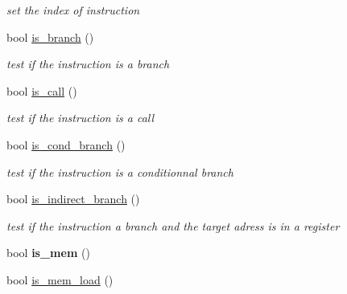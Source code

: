 \begin{DoxyCompactItemize}
\begin{DoxyCompactList}\small\item\em set the index of instruction \end{DoxyCompactList}\item 
\hypertarget{class_instruction_aab8e6a16b8bab5ca90b554086cc3c825}{bool \hyperlink{class_instruction_aab8e6a16b8bab5ca90b554086cc3c825}{is\-\_\-branch} ()}\label{class_instruction_aab8e6a16b8bab5ca90b554086cc3c825}

\begin{DoxyCompactList}\small\item\em test if the instruction is a branch \end{DoxyCompactList}\item 
\hypertarget{class_instruction_ab2a6352a09271a588f6930852a361f67}{bool \hyperlink{class_instruction_ab2a6352a09271a588f6930852a361f67}{is\-\_\-call} ()}\label{class_instruction_ab2a6352a09271a588f6930852a361f67}

\begin{DoxyCompactList}\small\item\em test if the instruction is a call \end{DoxyCompactList}\item 
\hypertarget{class_instruction_a1b607074554bc160142786c125bde530}{bool \hyperlink{class_instruction_a1b607074554bc160142786c125bde530}{is\-\_\-cond\-\_\-branch} ()}\label{class_instruction_a1b607074554bc160142786c125bde530}

\begin{DoxyCompactList}\small\item\em test if the instruction is a conditionnal branch \end{DoxyCompactList}\item 
\hypertarget{class_instruction_affdf2382cd36277fb4427cd3b07c1402}{bool \hyperlink{class_instruction_affdf2382cd36277fb4427cd3b07c1402}{is\-\_\-indirect\-\_\-branch} ()}\label{class_instruction_affdf2382cd36277fb4427cd3b07c1402}

\begin{DoxyCompactList}\small\item\em test if the instruction a branch and the target adress is in a register \end{DoxyCompactList}\item 
\hypertarget{class_instruction_a1c79865faf9baa4d70edf81e956d952d}{bool {\bfseries is\-\_\-mem} ()}\label{class_instruction_a1c79865faf9baa4d70edf81e956d952d}

\item 
\hypertarget{class_instruction_aee32f4bb91480afc74375beb139af4d6}{bool \hyperlink{class_instruction_aee32f4bb91480afc74375beb139af4d6}{is\-\_\-mem\-\_\-load} ()}\label{class_instruction_aee32f4bb91480afc74375beb139af4d6}


\end{DoxyCompactItemize}
